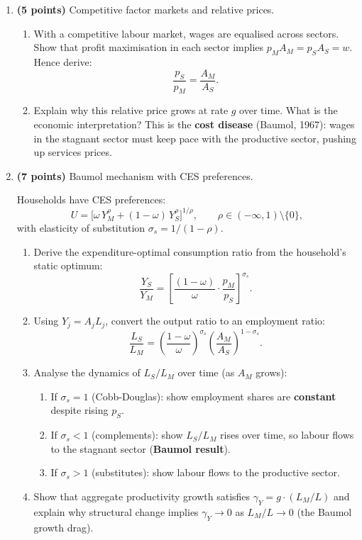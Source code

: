 \documentclass[a4paper,11pt]{article}
\begin{document}
\begin{enumerate}[label=\textbf{\arabic*.}, leftmargin=*, itemsep=6pt]

    \item \textbf{(5 points)} Competitive factor markets and relative prices.

    \begin{enumerate}[label=(\alph*), itemsep=4pt]
        \item With a competitive labour market, wages are equalised across sectors.  Show
        that profit maximisation in each sector implies $p_M A_M = p_S A_S = w$.  Hence
        derive:
        \[
            \frac{p_S}{p_M} = \frac{A_M}{A_S}.
        \]
        \item Explain why this relative price grows at rate $g$ over time.  What is the
        economic interpretation?  This is the \textbf{cost disease} (Baumol, 1967):
        wages in the stagnant sector must keep pace with the productive sector,
        pushing up services prices.
    \end{enumerate}

    \item \textbf{(7 points)} Baumol mechanism with CES preferences.

    Households have CES preferences:
    \[
        U = \bigl[\omega\,Y_M^{\rho} + (1-\omega)\,Y_S^{\rho}\bigr]^{1/\rho},
        \qquad \rho \in (-\infty, 1)\setminus\{0\},
    \]
    with elasticity of substitution $\sigma_s = 1/(1-\rho)$.

    \begin{enumerate}[label=(\alph*), itemsep=4pt]
        \item Derive the expenditure-optimal consumption ratio from the household's static
        optimum:
        \[
            \frac{Y_S}{Y_M} = \left[\frac{(1-\omega)}{\omega}\cdot\frac{p_M}{p_S}
            \right]^{\sigma_s}.
        \]
        \item Using $Y_j = A_j L_j$, convert the output ratio to an employment ratio:
        \[
            \frac{L_S}{L_M} = \left(\frac{1-\omega}{\omega}\right)^{\sigma_s}
            \left(\frac{A_M}{A_S}\right)^{1-\sigma_s}.
        \]
        \item Analyse the dynamics of $L_S/L_M$ over time (as $A_M$ grows):
        \begin{enumerate}[label=(\roman*), itemsep=2pt]
            \item If $\sigma_s = 1$ (Cobb-Douglas): show employment shares are
            \textbf{constant} despite rising $p_S$.
            \item If $\sigma_s < 1$ (complements): show $L_S/L_M$ rises over time,
            so labour flows to the stagnant sector (\textbf{Baumol result}).
            \item If $\sigma_s > 1$ (substitutes): show labour flows to the productive
            sector.
        \end{enumerate}
        \item Show that aggregate productivity growth satisfies $\gamma_Y = g\cdot(L_M/L)$
        and explain why structural change implies $\gamma_Y \to 0$ as $L_M/L \to 0$
        (the Baumol growth drag).
    \end{enumerate}


\end{enumerate}
\end{document}
